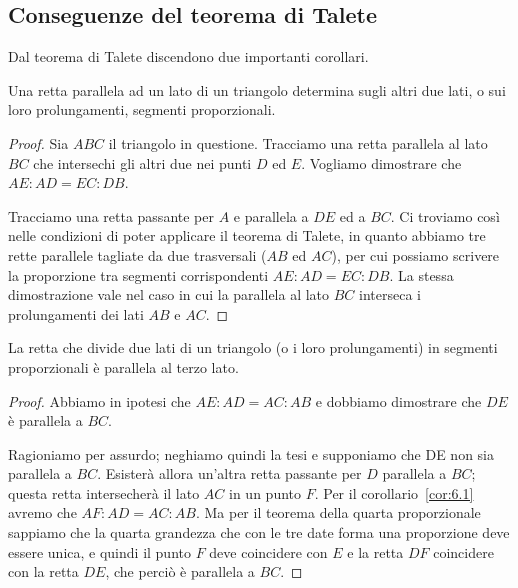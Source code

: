\subsection{Conseguenze del teorema di Talete}

Dal teorema di Talete discendono due importanti corollari.
\begin{corollario}\label{cor:6.1}
Una retta parallela ad un lato di un triangolo determina sugli altri 
due lati, o sui loro prolungamenti, segmenti proporzionali.
\end{corollario}

\begin{figure*}[!htb]
	\centering	
\end{figure*}

\begin{proof}
Sia $ABC$ il triangolo in questione. Tracciamo una retta parallela al 
lato $BC$ che intersechi gli altri due nei punti $D$ ed $E$. Vogliamo 
dimostrare che $AE : AD = EC : DB$.

Tracciamo una retta passante per $A$ e parallela a $DE$ ed a $BC$. Ci 
troviamo così nelle condizioni di poter applicare il teorema di 
Talete, in quanto abbiamo tre rette parallele tagliate da due 
trasversali ($AB$ ed $AC$), per cui possiamo scrivere la proporzione 
tra segmenti corrispondenti $AE : AD = EC : DB$.
La stessa dimostrazione vale nel caso in cui la parallela al lato 
$BC$ interseca i prolungamenti dei lati $AB$ e $AC$.
\end{proof}

\begin{corollario}\label{cor:6.2}
La retta che divide due lati di un triangolo (o i loro prolungamenti) 
in segmenti proporzionali è parallela al terzo lato.
\end{corollario}

\begin{figure*}[!htb]
	\centering	
\end{figure*}

\begin{proof}
Abbiamo in ipotesi che $AE : AD = AC : AB$ e dobbiamo dimostrare che 
$DE$ è parallela a $BC$.

Ragioniamo per assurdo; neghiamo quindi la tesi e supponiamo che DE 
non sia parallela a $BC$. Esisterà allora un'altra retta passante per 
$D$ parallela a $BC$; questa retta intersecherà il lato $AC$ in un 
punto $F$. Per il corollario~\ref{cor:6.1} avremo che $AF : AD = AC : 
AB$.
Ma per il teorema della quarta proporzionale sappiamo che la quarta 
grandezza che con le tre date forma una proporzione deve essere 
unica, e quindi il punto $F$ deve coincidere con $E$ e la retta $DF$ 
coincidere con la retta $DE$, che perciò è parallela a $BC$.
\end{proof}


